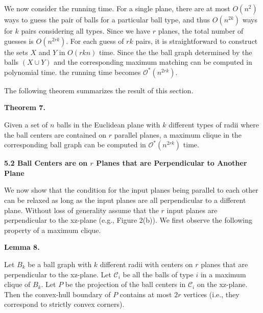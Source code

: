 \par
We now consider the running time. For a single plane, there are at most $O(n^{2})$ ways to guess the pair of balls for a particular ball type, and thus $O(n^{2k})$ ways for $k$ pairs considering all types. Since we have $r$ planes, the total number of guesses is $O(n^{2rk})$. For each guess of $rk$ pairs, it is straightforward to construct the sets $X$ and $Y$ in $O(rkn)$ time. Since the the ball graph determined by the balls $(X\cup Y)$ and the corresponding maximum matching can be computed in polynomial time. the running time becomes $\mathcal{O}^{*}(n^{2rk})$.
\par
\par
The following theorem summarizes the result of this section.
\par
\par
\par\medskip\noindent\textbf{Theorem 7.}\par
Given a set of $n$ balls in the Euclidean plane with $k$ different types of radii where the ball centers are contained on $r$ parallel planes, a maximum clique in the corresponding ball graph can be computed in $\mathcal{O}^{*}(n^{2rk})$ time.
\par
\par
\par
\par
\par
\par\medskip\noindent\textbf{5.2 Ball Centers are on $r$ Planes that are Perpendicular to Another Plane}\par
We now show that the condition for the input planes being parallel to each other can be relaxed as long as the input planes are all perpendicular to a different plane. Without loss of generality assume that the $r$ input planes are perpendicular to the xz-plane (e.g., Figure 2(b)). We first observe the following property of a maximum clique.
\par
\par
\par\medskip\noindent\textbf{Lemma 8.}\par
Let $B_{k}$ be a ball graph with $k$ different radii with centers on $r$ planes that are perpendicular to the xz-plane. Let $\mathcal{C}_{i}$ be all the balls of type $i$ in a maximum clique of $B_{k}$. Let $P$ be the projection of the ball centers in $\mathcal{C}_{i}$ on the xz-plane. Then the convex-hull boundary of $P$ contains at most $2r$ vertices (i.e., they correspond to strictly convex corners).
